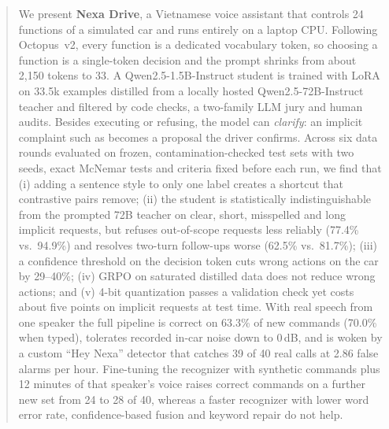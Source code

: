 \begin{abstract}
We present \textbf{Nexa Drive}, a Vietnamese voice assistant that controls 24 functions of a simulated car and runs entirely
on a laptop CPU. Following Octopus~v2, every function is a dedicated vocabulary token, so choosing a function is a single-token
decision and the prompt shrinks from about 2,150 tokens to 33. A Qwen2.5-1.5B-Instruct student
is trained with LoRA on 33.5k examples distilled from a locally hosted Qwen2.5-72B-Instruct teacher and filtered by code
checks, a two-family LLM jury and human audits. Besides executing or refusing, the model can \emph{clarify}: an implicit
complaint such as  becomes a proposal the driver confirms. Across six data rounds evaluated on
frozen, contamination-checked test sets with two seeds, exact McNemar tests and criteria fixed before each run, we find that
(i) adding a sentence style to only one label creates a shortcut that contrastive pairs remove; (ii) the student is
statistically indistinguishable from the prompted 72B teacher on clear, short, misspelled and long implicit requests, but
refuses out-of-scope requests less reliably (77.4\% vs.\ 94.9\%) and resolves two-turn follow-ups worse (62.5\% vs.\ 81.7\%); (iii) a confidence threshold on the decision token cuts wrong
actions on the car by 29--40\%; (iv) GRPO on saturated distilled data does not reduce wrong actions; and (v) 4-bit quantization
passes a validation check yet costs about five points on implicit requests at test time. With real speech from one speaker
the full pipeline is correct on 63.3\% of new commands (70.0\% when typed), tolerates recorded in-car noise down to 0\,dB, and
is woken by a custom ``Hey Nexa'' detector that catches 39 of 40 real calls at 2.86 false alarms per hour. Fine-tuning the
recognizer with synthetic commands plus 12 minutes of that speaker's voice raises correct commands on a further new set from
24 to 28 of 40, whereas a faster recognizer with lower word error rate, confidence-based fusion and keyword repair do not help.
\end{abstract}
